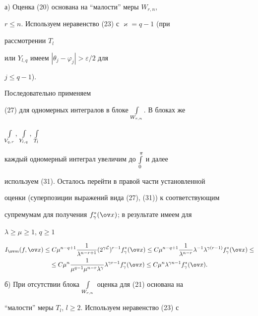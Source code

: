 \addtocounter{equation}{3} 


 


\begin{pf} а) Оценка (20) основана на ``малости'' меры $W_{r,n}$, 


$r\le n$. Используем неравенство (23) с $\varkappa=q-1$ (при 


рассмотрении $T_l$ 


или $Y_{l,q}$ имеем $|\theta_j-\varphi_j|>\varepsilon/2$ для 


$j\le q-1$). 


Последовательно применяем 


(27) для одномерных интегралов в блоке $\int\limits_{W_{r,n}}$. В блоках же 


$\int\limits_{V_{q,r}}$, $\int\limits_{Y_{l,q}}$, $\int\limits_{T_l}$ 


каждый одномерный интеграл увеличим до $\int\limits^\pi_0$ и далее 


используем (31). Осталось перейти в правой части установленной 


оценки (суперпозиции выражений вида (27), (31)) к соответствующим 


супремумам для получения $f^*_\gamma(\ov x)$; в результате имеем для 


$\lambda\ge\mu\ge 1$, $q\ge 1$ 


\begin{multline*} 


I_{\ov m}(f,\ov x)\le C\mu^{n-q+1} 


\frac{1}{\lambda^{n-r+1}}(2^{\gamma\cal L})^{r-1} 


f^*_\gamma(\ov x)\le C\mu^{n-q+1}\frac{1}{\lambda^{n-r}} 


\lambda^{-1}\lambda^{\gamma(r-1)}f^*_\gamma(\ov x)\le \\ 


% 


\le C\mu^n\frac{1}{\mu^{q-1}\mu^{n-r}\lambda^\gamma} 


\lambda^{\gamma r-1}f^*_\gamma(\ov x)\le 


C\mu^n\lambda^{\gamma n-1}f^*_\gamma(\ov x). 


\end{multline*} 


 


б) При отсутствии блока $\int\limits_{W_{r,n}}$ оценка для (21) основана на 


``малости'' меры $T_l$, $l\ge 2$. Используем неравенство (23) с 



\end{pf}
